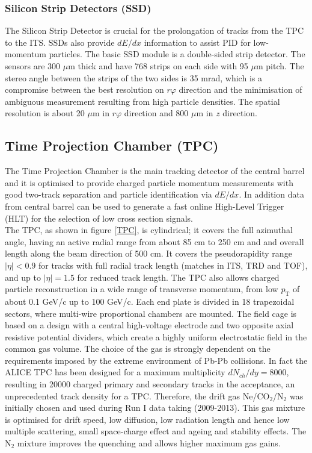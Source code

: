 \documentclass[b5paper,10pt,twoside,oldstyle,classica]{toptesi}
\newcommand{\pt}{p_\text{T}}
\begin{document}
\subsubsection{Silicon Strip Detectors (SSD)}
The Silicon Strip Detector is crucial for the prolongation of tracks from the TPC to the ITS. SSDs also provide $dE/dx$ information to assist PID for low-momentum particles. 
The basic SSD module is a double-sided strip detector. The sensors are 300 $\mu$m thick and have 768 strips on each side with 95 $\mu$m pitch. The stereo angle between the strips of the two sides is 35 mrad, which is a compromise between the best resolution on $r\varphi$ direction and the minimisation of ambiguous measurement resulting from high particle densities.
The spatial resolution is about 20 $\mu$m in $r\varphi$ direction and 800 $\mu$m in $z$ direction. 
\subsection{Time Projection Chamber (TPC)}
The Time Projection Chamber \cite{Schmidt:2010zzc} is the main tracking detector of the central barrel and it is optimised to provide charged particle momentum measurements with good two-track separation and particle identification via $dE/dx$. In addition data from central barrel can be used to generate a fast online High-Level Trigger (HLT) for the selection of low cross section signals.\\
The TPC, as shown in figure \ref{TPC}, is cylindrical; it covers the full azimuthal angle, having an active radial range from about 85 cm to 250 cm and and overall length along the beam direction of 500 cm. It covers the pseudorapidity range $|\eta| < 0.9$ for tracks with full radial track length (matches in ITS, TRD and TOF), and up to $|\eta| = 1.5$ for reduced track length. The TPC also allows charged particle reconstruction in a wide range of transverse momentum, from low $\pt$ of about 0.1 GeV/c up to 100 GeV/c. Each end plate is divided in 18 trapezoidal sectors, where multi-wire proportional chambers are mounted. The field cage is based on a design with a central high-voltage electrode and two opposite axial resistive potential dividers, which create a highly uniform electrostatic field in the common gas volume.
The choice of the gas is strongly dependent on the requirements imposed by the extreme environment of Pb-Pb collisions. In fact the ALICE TPC has been designed for a maximum multiplicity $dN_{ch}/dy = 8000$, resulting in 20000 charged primary and secondary tracks in the acceptance, an unprecedented track density for a TPC. Therefore, the drift gas Ne/CO$_2$/N$_2$ was initially chosen and used during Run I data taking (2009-2013). This gas mixture is optimised for drift speed, low diffusion, low radiation length and hence low multiple scattering, small space-charge effect and ageing and stability effects. The N$_2$ mixture improves the quenching and allows higher maximum gas gains. 
\end{document}
